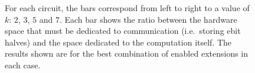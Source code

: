 \begin{figure}
\centering
{}
\caption{For each circuit, the bars correspond from left to right to a value of \(k\): \(2\), \(3\), \(5\) and \(7\). Each bar shows the ratio between the hardware space that must be dedicated to communication (i.e.\ storing ebit halves) and the space dedicated to the computation itself. The results shown are for the best combination of enabled extensions in each case.}
\label{fig:results1}
\end{figure}
